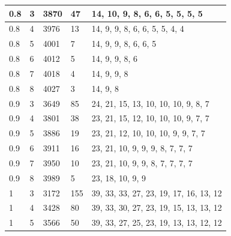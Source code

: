 \documentclass{VUMIFInfKursinis}
\begin{document}
\begin{table}[!ht]
\begin{tabular}{|l|l|l|l|l|}
\rowcolor[HTML]{EFEFEF} 
0.8        & 3            & 3870               & 47                        & 14, 10, 9, 8, 6, 6, 5, 5, 5, 5            \\ \hline
\rowcolor[HTML]{EFEFEF} 
0.8        & 4            & 3976               & 13                        & 14, 9, 9, 8, 6, 6, 5, 5, 4, 4             \\ \hline
\rowcolor[HTML]{EFEFEF} 
0.8        & 5            & 4001               & 7                         & 14, 9, 9, 8, 6, 6, 5                      \\ \hline
\rowcolor[HTML]{EFEFEF} 
0.8        & 6            & 4012               & 5                         & 14, 9, 9, 8, 6                            \\ \hline
\rowcolor[HTML]{EFEFEF} 
0.8        & 7            & 4018               & 4                         & 14, 9, 9, 8                               \\ \hline
\rowcolor[HTML]{EFEFEF} 
0.8        & 8            & 4027               & 3                         & 14, 9, 8                                  \\ \hline
0.9        & 3            & 3649               & 85                        & 24, 21, 15, 13, 10, 10, 10, 9, 8, 7       \\ \hline
0.9        & 4            & 3801               & 38                        & 23, 21, 15, 12, 10, 10, 10, 9, 7, 7       \\ \hline
0.9        & 5            & 3886               & 19                        & 23, 21, 12, 10, 10, 10, 9, 9, 7, 7        \\ \hline
0.9        & 6            & 3911               & 16                        & 23, 21, 10, 9, 9, 9, 8, 7, 7, 7           \\ \hline
0.9        & 7            & 3950               & 10                        & 23, 21, 10, 9, 9, 8, 7, 7, 7, 7           \\ \hline
0.9        & 8            & 3989               & 5                         & 23, 18, 10, 9, 9                          \\ \hline
\rowcolor[HTML]{EFEFEF} 
1          & 3            & 3172               & 155                       & 39, 33, 33, 27, 23, 19, 17, 16, 13, 12    \\ \hline
\rowcolor[HTML]{EFEFEF} 
1          & 4            & 3428               & 80                        & 39, 33, 30, 27, 23, 19, 15, 13, 13, 12    \\ \hline
\rowcolor[HTML]{EFEFEF} 
1          & 5            & 3566               & 50                        & 39, 33, 27, 25, 23, 19, 13, 13, 12, 12    \\ \hline

\end{tabular}
\end{table}
\end{document}
